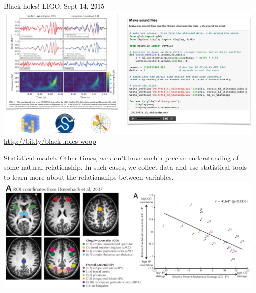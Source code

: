 \documentclass[aspectratio=169]{../latex_main/tntbeamer}  %
\begin{document}
	
	\begin{frame}{Black holes! LIGO, Sept 14, 2015}
	    \includegraphics[scale=.35]{Bild15}\\
	    \vspace{-.5cm}
	    \hspace{7cm}  \url{http://bit.ly/black-holes-woop}
	\end{frame}
	
	
	
	\begin{frame}{Statistical models}
	    Other times, we don’t have such a precise understanding of some natural relationship. In such cases, we collect data and use statistical tools to learn more about the relationships between variables.\\
	    \hspace{1cm}
	    \includegraphics[scale=.45]{Bild16}
	\end{frame}
\end{document}

